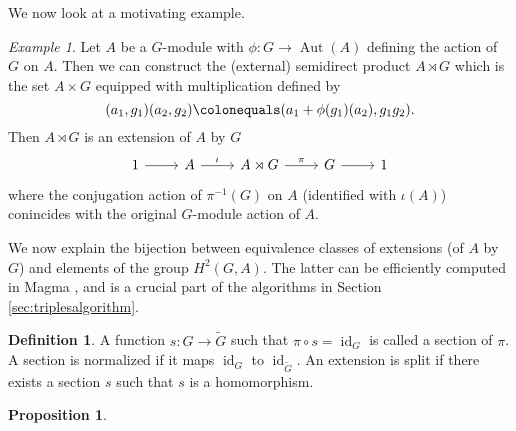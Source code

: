 \documentclass{dcthesis}
\newcommand{\defi}[1]{\textsf{#1}}
\newcommand{\wt}[1]{\widetilde{#1}}
\DeclareMathOperator{\Aut}{Aut}
\DeclareMathOperator{\id}{id}
\numberwithin{equation}{section}
\newtheorem{prop}[equation]{Proposition}
\theoremstyle{definition}
\newtheorem{definition}[equation]{Definition}
\theoremstyle{remark}
\newtheorem{example}[equation]{Example}
\begin{document}
{{{    %
    We now look at a motivating example.
    \begin{example}
      \label{exm:semidirectproduct}
      Let $A$ be a $G$-module
      with $\phi\colon G\to\Aut(A)$
      defining the action of $G$ on $A$.
      Then we can construct
      the \defi{(external) semidirect product}
      $A\rtimes G$ which is the set
      $A\times G$ equipped with multiplication
      defined by
      \[
        (a_1,g_1)(a_2,g_2)\colonequals
        (a_1+\phi(g_1)(a_2), g_1g_2).
      \]
      Then $A\rtimes G$
      is an extension of $A$ by $G$
      \[
        \begin{tikzcd}
          1\arrow{r}&A\arrow{r}{\iota}&A\rtimes G\arrow{r}{\pi}&G\arrow{r}&1
        \end{tikzcd}
      \]
      where the conjugation action of $\pi^{-1}(G)$
      on $A$
      (identified with $\iota(A)$)
      conincides with the original
      $G$-module action of $A$.
    \end{example}
    We now explain the bijection between
    equivalence classes of extensions
    (of $A$ by $G$)
    and elements of the group
    $H^2(G,A)$.
    The latter
    can be efficiently computed in \textsf{Magma}
    \cite{magmabook},
    and is a crucial part of the algorithms
    in
    Section \ref{sec:triplesalgorithm}.
    \begin{definition}
      \label{def:section}
      A function $s\colon G\to\wt{G}$
      such that $\pi\circ s = \id_G$
      is called a
      \defi{section}
      of $\pi$.
      A section is
      \defi{normalized}
      if it maps $\id_G$
      to
      $\id_{\wt{G}}$.
      An extension
      is \defi{split}
      if there exists a section $s$ such that
      $s$ is a homomorphism.
    \end{definition}
    \begin{prop}
      \label{prop:splitextensions}

\end{prop}}}}
\end{document}
